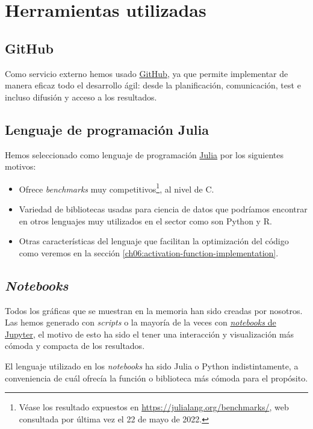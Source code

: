 
\section{Herramientas utilizadas}

\subsection{GitHub}
Como servicio externo hemos usado \href{https://github.com}{GitHub}, ya que permite implementar de manera eficaz
 todo el desarrollo ágil: 
desde la planificación, comunicación, test e incluso difusión y acceso a los resultados. 

\subsection{Lenguaje de programación Julia}
Hemos seleccionado como lenguaje de programación \href{https://julialang.org}{Julia} 
por los siguientes motivos: 
\begin{itemize}
    \item Ofrece \textit{benchmarks} 
    muy competitivos\footnote{Véase los resultado expuestos en 
    \url{https://julialang.org/benchmarks/}, 
    web consultada por última vez el 22 de mayo de 2022.},
    al nivel de C.
    \item Variedad de bibliotecas usadas para ciencia de datos que podríamos encontrar 
    en otros lenguajes muy utilizados en el sector como son Python y R. 
    \item Otras características del lenguaje que facilitan 
    la optimización del código como veremos en la sección \ref{ch06:activation-function-implementation}. 
\end{itemize}

\subsection{\textit{Notebooks}}

Todos los gráficas que se muestran en la memoria han sido creadas por nosotros. 
Las hemos generado con \textit{scripts} o la mayoría de la veces con 
\href{https://jupyter.org}{\textit{notebooks} de Jupyter}, el motivo de esto ha 
sido el tener una interacción y visualización más cómoda y compacta de los resultados.

El lenguaje utilizado en los \textit{notebooks} ha sido Julia o Python indistintamente,
a conveniencia de cuál ofrecía la función o biblioteca más cómoda para el propósito.  


 